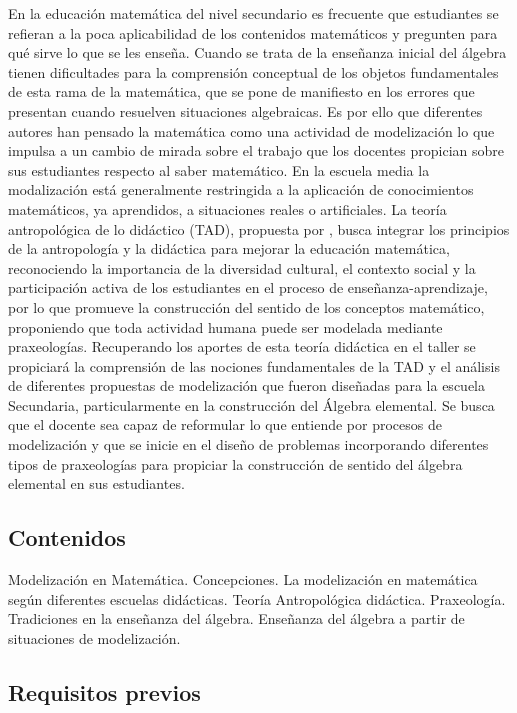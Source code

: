 En la educación matemática del nivel secundario es frecuente que estudiantes se refieran a la poca aplicabilidad de los contenidos matemáticos y pregunten para qué sirve lo que se les enseña. Cuando se trata de la enseñanza inicial del álgebra tienen dificultades para la comprensión conceptual de los objetos fundamentales de esta rama de la matemática, que se pone de manifiesto en los errores que presentan cuando resuelven situaciones algebraicas. Es por ello que diferentes autores han pensado la matemática como una actividad de modelización lo que impulsa a un cambio de mirada sobre el trabajo que los docentes propician sobre sus estudiantes respecto al saber matemático. En la escuela media la modalización está generalmente restringida a la aplicación de conocimientos matemáticos, ya aprendidos, a situaciones reales o artificiales. La teoría antropológica de lo didáctico (TAD), propuesta por \textcite{chevallard1999}, busca integrar los principios de la antropología y la didáctica para mejorar la educación matemática, reconociendo la importancia de la diversidad cultural, el contexto social y la participación activa de los estudiantes en el proceso de enseñanza-aprendizaje, por lo que promueve la construcción del sentido de los conceptos matemático, proponiendo que toda actividad humana puede ser modelada mediante praxeologías. Recuperando los aportes de esta teoría didáctica en el taller se propiciará la comprensión de las nociones fundamentales de la TAD y el análisis de diferentes propuestas de modelización que fueron diseñadas para la escuela Secundaria, particularmente en la construcción del Álgebra elemental. Se busca que el docente sea capaz de reformular lo que entiende por procesos de modelización y que se inicie en el diseño de problemas incorporando diferentes tipos de praxeologías para propiciar la construcción de sentido del álgebra elemental en sus estudiantes.

\subsection{Contenidos}

Modelización en Matemática. Concepciones. La modelización en matemática según diferentes escuelas didácticas. Teoría Antropológica didáctica. Praxeología. Tradiciones en la enseñanza del álgebra. Enseñanza del álgebra a partir de situaciones de modelización.

\subsection{Requisitos previos}

